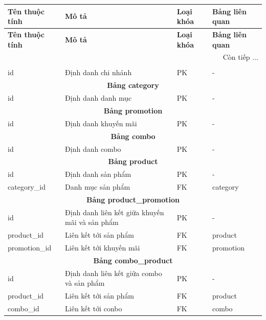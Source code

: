 \begin{longtable}{|l|p{6cm}|l|l|}
\hline
\textbf{Tên thuộc tính} & \textbf{Mô tả} & \textbf{Loại khóa} & \textbf{Bảng liên quan} \\
\hline
\endfirsthead

\hline
\textbf{Tên thuộc tính} & \textbf{Mô tả} & \textbf{Loại khóa} & \textbf{Bảng liên quan} \\
\hline
\endhead

\hline \multicolumn{4}{|r|}{{Còn tiếp ...}} \\
\hline
\endfoot

\hline
\endlastfoot

\multicolumn{4}{|c|}{\textbf{Bảng branch}} \\
\hline
id & Định danh chi nhánh & PK & - \\
\hline

\multicolumn{4}{|c|}{\textbf{Bảng category}} \\
\hline
id & Định danh danh mục & PK & - \\
\hline

\multicolumn{4}{|c|}{\textbf{Bảng promotion}} \\
\hline
id & Định danh khuyến mãi & PK & - \\
\hline

\multicolumn{4}{|c|}{\textbf{Bảng combo}} \\
\hline
id & Định danh combo & PK & - \\
\hline

\multicolumn{4}{|c|}{\textbf{Bảng product}} \\
\hline
id & Định danh sản phẩm & PK & - \\
category\_id & Danh mục sản phẩm & FK & category \\
\hline

\multicolumn{4}{|c|}{\textbf{Bảng product\_promotion}} \\
\hline
id & Định danh liên kết giữa khuyến mãi và sản phẩm & PK & - \\
product\_id & Liên kết tới sản phẩm & FK & product \\
promotion\_id & Liên kết tới khuyến mãi & FK & promotion \\
\hline

\multicolumn{4}{|c|}{\textbf{Bảng combo\_product}} \\
\hline
id & Định danh liên kết giữa combo và sản phẩm & PK & - \\
product\_id & Liên kết tới sản phẩm & FK & product \\
combo\_id & Liên kết tới conbo & FK & combo \\
\hline


\end{longtable}
